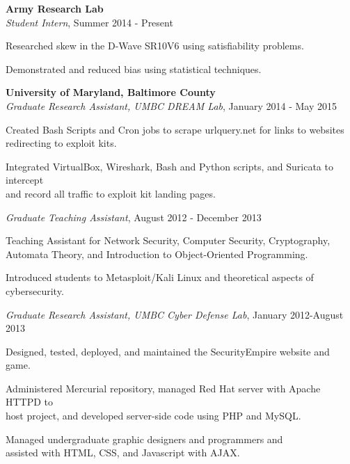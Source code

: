 \medskip
\atab \textbf{Army Research Lab}\\
\btab \textit{Student Intern}, Summer 2014 - Present\\
\begin{my_list}
\item Researched skew in the D-Wave SR10V6 using satisfiability problems.
\item Demonstrated and reduced bias using statistical techniques.
\end{my_list}

\medskip
\atab \textbf{University of Maryland, Baltimore County}\\
\btab \textit{Graduate Research Assistant, UMBC DREAM Lab}, January 2014 - May 2015\\
\begin{my_list}
\item Created Bash Scripts and Cron jobs to scrape urlquery.net for links to websites\\ \tab \tab redirecting to exploit kits.
\item Integrated VirtualBox, Wireshark, Bash and Python scripts, and Suricata to intercept\\ \tab \tab and record all traffic to exploit kit landing pages.
\end{my_list}

\btab \textit{Graduate Teaching Assistant}, August 2012 - December 2013\\
\begin{my_list}
\item Teaching Assistant for Network Security, Computer Security, Cryptography,\\ \tab \tab Automata Theory, and Introduction to Object-Oriented Programming.
\item Introduced students to Metasploit/Kali Linux and theoretical aspects of cybersecurity.
\end{my_list}

\btab \textit{Graduate Research Assistant, UMBC Cyber Defense Lab}, January 2012-August 2013\\
\begin{my_list}
\item Designed, tested, deployed, and maintained the SecurityEmpire website and game.
\item Administered Mercurial repository, managed Red Hat server with Apache HTTPD to\\ \tab \tab host project, and developed server-side code using PHP and MySQL.
\item Managed undergraduate graphic designers and programmers and\\ \tab \tab assisted with HTML, CSS, and Javascript with AJAX.
\end{my_list}

